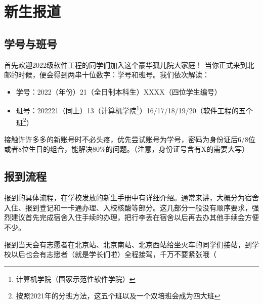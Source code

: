 \section{新生报道}

\subsection{学号与班号}

首先欢迎2022级软件工程的同学们加入这个豪华\sout{孤儿院}大家庭！
当你正式来到北邮的时候，便会得到两串十位数字：学号和班号。我们依次解读：
\begin{itemize}
    \kaishu
    \item 学号：2022（年份）21（全日制本科生）XXXX（四位学生编号）
    \item 班号：202221（同上）13（计算机学院\footnote{计算机学院（国家示范性软件学院）}）16/17/18/19/20（软件工程的五个班\footnote{按照2021年的分班方法，这五个班以及一个双培班会成为四大班}）
\end{itemize}

接触许许多多的新账号时不必头疼，优先尝试账号为学号，密码为身份证后6/8位或者8位生日的组合，能解决80\%的问题。（注意，身份证号含有X的需要大写）

\subsection{报到流程}

报到的具体流程，在学校发放的新生手册中有详细介绍。通常来讲，大概分为宿舍入住、报到登记和一卡通办理、入校核酸等部分。这几部分一般没有顺序要求，强烈建议首先完成宿舍入住手续的办理，把行李丢在宿舍以后再去办其他手续会方便不少。

报到当天会有志愿者在北京站、北京南站、北京西站给坐火车的同学们接站，到学校以后也会有志愿者（就是学长们啦）全程接驾，千万不要紧张哦（
